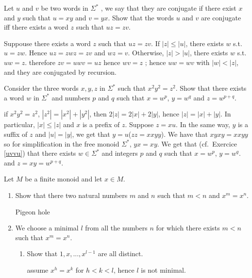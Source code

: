 \documentclass[a4paper,11pt]{exam}
\begin{document}
\begin{questions}
  \question
  Let $u$ and $v$ be two words in $\Sigma^*$ , we say that they are conjugate if there exist 
  $x$ and $y$ such that $u=xy$ and $v=yx$.
  Show that the words $u$ and $v$ are conjugate iff there exists a word $z$ such that $uz = zv$.

  \begin{solution}
    Suppouse there exists a word $z$ such that $uz = zv$. If $|z| \leq |u|$,
    there exists $w$ s.t. $u = zw$.
    Hence $uz = zwz = zv$ and $wz = v$.
    Otherwise, $|z| > |u|$, there exists $w$ s.t. $uw = z$.
    therefore $zv = uwv = uz$ hence $wv = z$ ; hence $uw = wv$ with $|w| < |z|$,
    and they are conjugated by recursion.
  \end{solution}

  \question
  Consider the three words $x,y,z$ in $\Sigma^*$ such that $x^2y^2=z^2$.
  Show that there exists a word $w$ in $\Sigma^*$ and numbers $p$ and $q$
  such that $x=w^p$, $y=w^q$ and $z=w^{p+q}$.

  \begin{solution}
    if $x^2 y^2 = z^2$, $|z^2| = |x^2| + |y^2|$, then $2|z| = 2|x| + 2|y|$,
    hence $|z| = |x| + |y|$.
    In particular, $|x| \leq |z|$ and $x$ is a prefix of $z$.
    Suppose $z=xu$.
    In the same way, $y$ is a suffix of $z$ and $|u|=|y|$, we get that $y=u$($zz=xxyy$).
    We have that $xyxy=xxyy$ so for simplification in
    the free monoid $\Sigma^*$, $yx=xy$.
    We get that (cf.\ Exercice \ref{uvvu}) that there exists
    $w \in \Sigma^*$ and integers $p$ and $q$ such that $x=w^p$, $y=w^q$.
    and $z=xy=w^{p+q}$.
  \end{solution}

  \question
  Let $M$ be a finite monoid and let $x \in M$.
  \begin{enumerate}
    \item Show that there two natural numbers $m$ and $n$ such that $m<n$ and
      $x^m = x^n$.

      \begin{solution}
        Pigeon hole
      \end{solution}

    \item We choose a minimal $l$ from all the numbers $n$ for which there exists
      $m<n$ such that $x^m = x^n$.
      \begin{enumerate}
        \item Show that $1,x,...,x^{l-1}$ are all distinct.

          \begin{solution}
            assume $x^h=x^k$ for $h<k<l$, hence $l$ is not minimal. 
          \end{solution}


\end{enumerate}
\end{enumerate}
\end{questions}
\end{document}
